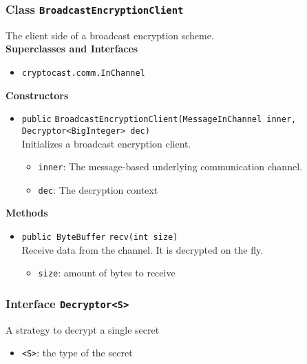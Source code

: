 \subsubsection{Class \lstinline|BroadcastEncryptionClient|}
The client side of a broadcast encryption scheme. \\


\textbf{Superclasses and Interfaces}
\begin{itemize}
\item \lstinline|cryptocast.comm.InChannel|
\end{itemize}



\textbf{Constructors}
\begin{itemize}
\item \lstinline|public| \lstinline|BroadcastEncryptionClient|\lstinline|(MessageInChannel inner, Decryptor<BigInteger> dec)|\\
Initializes a broadcast encryption client.
\begin{itemize}
\item \lstinline|inner|: The message-based underlying communication channel.
\item \lstinline|dec|: The decryption context
\end{itemize}



\end{itemize}


\textbf{Methods}
\begin{itemize}
\item \lstinline|public ByteBuffer| \lstinline|recv|\lstinline|(int size)|\\
Receive data from the channel. It is decrypted on the fly.
\begin{itemize}
\item \lstinline|size|: amount of bytes to receive
\end{itemize}



\end{itemize}

\subsubsection{Interface \lstinline|Decryptor<S>|}
A strategy to decrypt a single secret \\


\begin{itemize}
\item \lstinline|<S>|: the type of the secret
\end{itemize}



